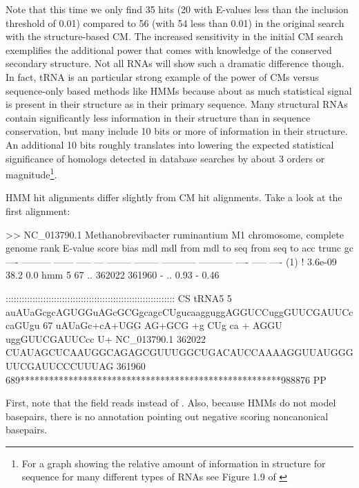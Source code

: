 Note that this time we only find 35 hits (20 with E-values less than
the inclusion threshold of 0.01) compared to 56 (with 54 less than
0.01) in the original search with the structure-based CM. The
increased sensitivity in the initial CM search exemplifies the
additional power that comes with knowledge of the conserved secondary
structure. Not all RNAs will show such a dramatic difference
though. In fact, tRNA is an particular strong example of the power of
CMs versus sequence-only based methods like HMMs because about as much
statistical signal is present in their structure as in their primary
sequence. Many structural RNAs contain significantly less information
in their structure than in sequence conservation, but many include 10
bits or more of information in their structure. An additional 10 bits
roughly translates into lowering the expected statistical significance
of homologs detected in database searches by about 3 orders or
magnitude\footnote{For a graph showing the relative amount of
information in structure for sequence for many different types of RNAs
see Figure 1.9 of \citep{Nawrocki09}}.

HMM hit alignments differ slightly from CM hit alignments. Take a look
at the first alignment:

\begin{sreoutput}
>> NC_013790.1  Methanobrevibacter ruminantium M1 chromosome, complete genome
 rank     E-value  score  bias mdl mdl from   mdl to       seq from      seq to       acc trunc   gc
 ----   --------- ------ ----- --- -------- --------    ----------- -----------      ---- ----- ----
  (1) !   3.6e-09   38.2   0.0 hmm        5       67 ..      362022      361960 - .. 0.93     - 0.46

                     ::::::::::::::::::::::::::::::::::::::::::::::::::::::::::::::: CS
        tRNA5      5 auAUaGcgcAGUGGuAGcGCGgcagcCUgucaagguggAGGUCCuggGUUCGAUUCccaGUgu 67    
                      uAUaGc+cA+UGG AG+GCG  +g CUg ca  +   AGGU  uggGUUCGAUUCcc  U+ 
  NC_013790.1 362022 CUAUAGCUCAAUGGCAGAGCGUUUGGCUGACAUCCAAAAGGUUAUGGGUUCGAUUCCCUUUAG 361960
                     689******************************************************988876 PP
\end{sreoutput}

First, note that the  field reads  instead of
. Also, because HMMs do not model basepairs, there is no
 annotation pointing out negative scoring noncanonical
basepairs.

